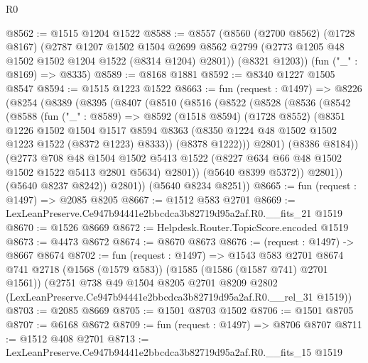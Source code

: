 \begin{lexlean}{R0}
\begin{coremodule}
@8562 := @1515 @1204 @1522
@8588 := @8557
    (@8560
      (@2700 @8562)
      (@1728 @8167)
      (@2787
        @1207
        @1502
        @1504
        @2699
        @8562
        @2799
        (@2773 @1205 @48 @1502 @1502 @1204 @1522 (@8314 @1204) @2801))
      (@8321 @1203))
    (fun ("_" : @8169) => @8335)
@8589 := @8168 @1881
@8592 := @8340 @1227 @1505 @8547
@8594 := @1515 @1223 @1522
@8663 := fun (request : @1497) =>
  @8226
    (@8254
      (@8389
        (@8395
          (@8407
            (@8510
              (@8516
                (@8522
                  (@8528
                    (@8536
                      (@8542
                        (@8588
                          (fun ("_" : @8589) =>
                          @8592
                            (@1518 @8594)
                            (@1728 @8552)
                            (@8351
                              @1226
                              @1502
                              @1504
                              @1517
                              @8594
                              @8363
                              (@8350 @1224 @48 @1502 @1502 @1223 @1522 (@8372 @1223) @8333))
                            (@8378 @1222)))
                        @2801)
                      (@8386 @8184))
                    (@2773
                      @708
                      @48
                      @1504
                      @1502
                      @5413
                      @1522
                      (@8227 @634 @66 @48 @1502 @1502 @1522 @5413 @2801 @5634)
                      @2801))
                  (@5640 @8399 @5372))
                @2801))
            (@5640 @8237 @8242))
          @2801))
      (@5640 @8234 @8251))
@8665 := fun (request : @1497) => @2085 @8205
@8667 := @1512 @583 @2701
@8669 := LexLeanPreserve.Ce947b94441e2bbcdca3b82719d95a2af.R0.__fits_21 @1519
@8670 := @1526 @8669
@8672 := Helpdesk.Router.TopicScore.encoded @1519
@8673 := @4473 @8672
@8674 := @8670 @8673
@8676 := (request : @1497) -> @8667 @8674
@8702 := fun (request : @1497) =>
  @1543
    @583
    @2701
    @8674
    @741
    @2718
    (@1568 (@1579 @583))
    (@1585 (@1586 (@1587 @741) @2701 @1561))
    (@2751
      @738
      @49
      @1504
      @8205
      @2701
      @8209
      @2802
      (LexLeanPreserve.Ce947b94441e2bbcdca3b82719d95a2af.R0.__rel_31 @1519))
@8703 := @2085 @8669
@8705 := @1501 @8703 @1502
@8706 := @1501 @8705
@8707 := @6168 @8672
@8709 := fun (request : @1497) => @8706 @8707
@8711 := @1512 @408 @2701
@8713 := LexLeanPreserve.Ce947b94441e2bbcdca3b82719d95a2af.R0.__fits_15 @1519

\end{coremodule}
\end{lexlean}
